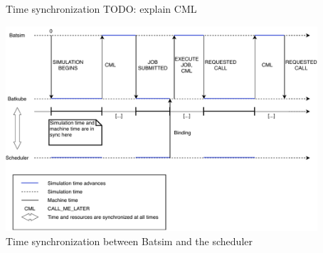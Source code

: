 \documentclass[12pt, aspectratio=43]{beamer}
\begin{document}
\begin{frame}[allowframebreaks]{Time synchronization}
	TODO: explain CML
	\framebreak

	\centering
	\includegraphics[width=0.87\textwidth]{../imgs/lignes_de_temps_simple.pdf}\\
	\small{Time synchronization between Batsim and the scheduler}
\end{frame}
\end{document}
